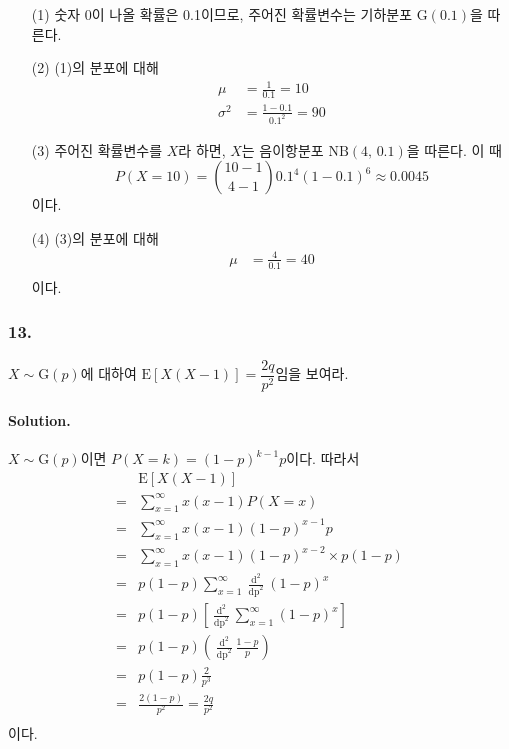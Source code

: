\begin{itemize}
	\item [(1)] {
        숫자 0이 나올 확률은 0.1이므로, 주어진 확률변수는 기하분포 $\mathrm{G}\left(0.1\right)$을 따른다.
    }
    \item [(2)] {
        (1)의 분포에 대해
        \begin{align*}
            \mu &= \frac{1}{0.1} = 10\\
            \sigma^2 &= \frac{1-0.1}{0.1^2} = 90
        \end{align*}
    }
    \item [(3)] {
        주어진 확률변수를 $X$라 하면, $X$는 음이항분포 $\mathrm{NB}\left(4,\,0.1\right)$을 따른다. 이 때
        \[P\left(X=10\right)=\binom{10-1}{4-1}0.1^4\left(1 - 0.1\right)^{6}\approx0.0045\]
        이다.
    }
    \item [(4)] {
        (3)의 분포에 대해
        \begin{align*}
            \mu &= \frac{4}{0.1} = 40\\
        \end{align*}
        이다.
    }
\end{itemize}

\subsubsection{13.} $X\sim \mathrm{G}\left(p\right)$에 대하여 $\mathrm{E}\left[X\left(X - 1\right)\right]=\dfrac{2q}{p^2}$임을 보여라.

\paragraph{Solution.} $X\sim \mathrm{G}\left(p\right)$이면 $P\left(X=k\right)=\left(1-p\right)^{k-1}p$이다. 따라서
\begin{align*}
    & \mathrm{E}\left[X\left(X - 1\right)\right] \\
    =& \sum_{x=1}^{\infty} x\left(x-1\right)P\left(X=x\right) \\
    =& \sum_{x=1}^{\infty} x\left(x-1\right)\left(1-p\right)^{x-1}p \\
    =& \sum_{x=1}^{\infty} x\left(x-1\right)\left(1-p\right)^{x-2} \times p\left(1-p\right) \\
    =& p\left(1-p\right) \sum_{x=1}^{\infty} \frac{\mathop{d}^2}{\mathop{dp}^2} \left(1-p\right)^x \\
    =& p\left(1-p\right) \left[\frac{\mathop{d}^2}{\mathop{dp}^2} \sum_{x=1}^{\infty} \left(1-p\right)^x\right] \\
    =& p\left(1-p\right) \left(\frac{\mathop{d}^2}{\mathop{dp}^2} \frac{1-p}{p}\right) \\
    =& p\left(1-p\right) \frac{2}{p^3} \\
    =& \frac{2\left(1-p\right)}{p^2} = \frac{2q}{p^2}\\
\end{align*}
이다.

